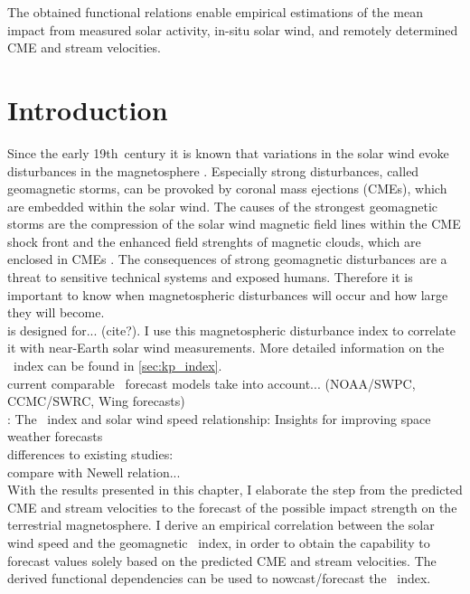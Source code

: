 The obtained functional relations enable empirical estimations of the mean \Kp{} impact from measured solar activity, in-situ solar wind, and remotely determined CME and stream velocities.



\section{Introduction}
Since the early 19th~century it is known that variations in the solar wind evoke disturbances in the magnetosphere \citep{Bartels1962}. Especially strong disturbances, called geomagnetic storms, can be provoked by coronal mass ejections (CMEs), which are embedded within the solar wind. The causes of the strongest geomagnetic storms are the compression of the solar wind magnetic field lines within the CME shock front and the enhanced field strenghts of magnetic clouds, which are enclosed in CMEs \citep{Bothmer1993,Bothmer1995}. The consequences of strong geomagnetic disturbances are a threat to sensitive technical systems and exposed humans. Therefore it is important to know when magnetospheric disturbances will occur and how large they will become.\\

\Kp{} is designed for... (cite?). I use this magnetospheric disturbance index to correlate it with near-Earth solar wind measurements. More detailed information on the \Kp{}~index can be found in \autoref{sec:kp_index}.\\

current comparable \Kp~forecast models take into account... (NOAA/SWPC, CCMC/SWRC, Wing forecasts)\\
\citet{Elliott2013}: The \Kp~index and solar wind speed relationship: Insights for improving space weather forecasts\\
differences to existing studies:\\
compare with Newell relation...\\

With the results presented in this chapter, I elaborate the step from the predicted CME and stream velocities to the forecast of the possible impact strength on the terrestrial magnetosphere. I derive an empirical correlation between the solar wind speed and the geomagnetic \Kp~index, in order to obtain the capability to forecast \Kp{} values solely based on the predicted CME and stream velocities. The derived functional dependencies can be used to nowcast/forecast the \Kp~index.\\

